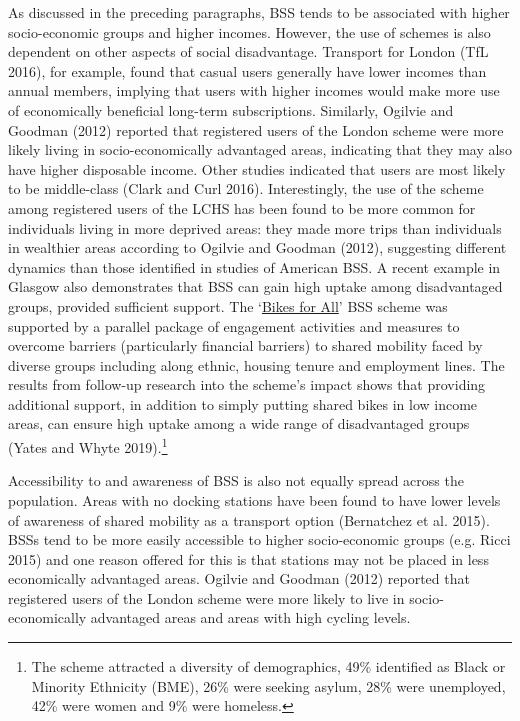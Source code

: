 \documentclass[]{article}
\begin{document}
As discussed in the preceding paragraphs, BSS tends to be associated with higher socio-economic groups and higher incomes.
However, the use of schemes is also dependent on other aspects of social disadvantage.
Transport for London (TfL 2016), for example, found that casual users generally have lower incomes than annual members, implying that users with higher incomes would make more use of economically beneficial long-term subscriptions.
Similarly, Ogilvie and Goodman (2012) reported that registered users of the London scheme were more likely living in socio-economically advantaged areas, indicating that they may also have higher disposable income.
Other studies indicated that users are most likely to be middle-class (Clark and Curl 2016).
Interestingly, the use of the scheme among registered users of the LCHS has been found to be more common for individuals living in more deprived areas: they made more trips than individuals in wealthier areas according to Ogilvie and Goodman (2012), suggesting different dynamics than those identified in studies of American BSS.
A recent example in Glasgow also demonstrates that BSS can gain high uptake among disadvantaged groups, provided sufficient support.
The `\href{https://www.nextbike.co.uk/en/news/nextbike-provides-bikes-for-all-as-scheme-celebrates-community/}{Bikes for All}' BSS scheme was supported by a parallel package of engagement activities and measures to overcome barriers (particularly financial barriers) to shared mobility faced by diverse groups including along ethnic, housing tenure and employment lines.
The results from follow-up research into the scheme's impact shows that providing additional support, in addition to simply putting shared bikes in low income areas, can ensure high uptake among a wide range of disadvantaged groups (Yates and Whyte 2019).\footnote{The scheme attracted a diversity of demographics, 49\% identified as Black or Minority Ethnicity (BME), 26\% were seeking asylum, 28\% were unemployed, 42\% were women and 9\% were homeless.}

Accessibility to and awareness of BSS is also not equally spread across the population.
Areas with no docking stations have been found to have lower levels of awareness of shared mobility as a transport option (Bernatchez et al. 2015).
BSSs tend to be more easily accessible to higher socio-economic groups (e.g. Ricci 2015) and one reason offered for this is that stations may not be placed in less economically advantaged areas.
Ogilvie and Goodman (2012) reported that registered users of the London scheme were more likely to live in socio-economically advantaged areas and areas with high cycling levels.
\end{document}
